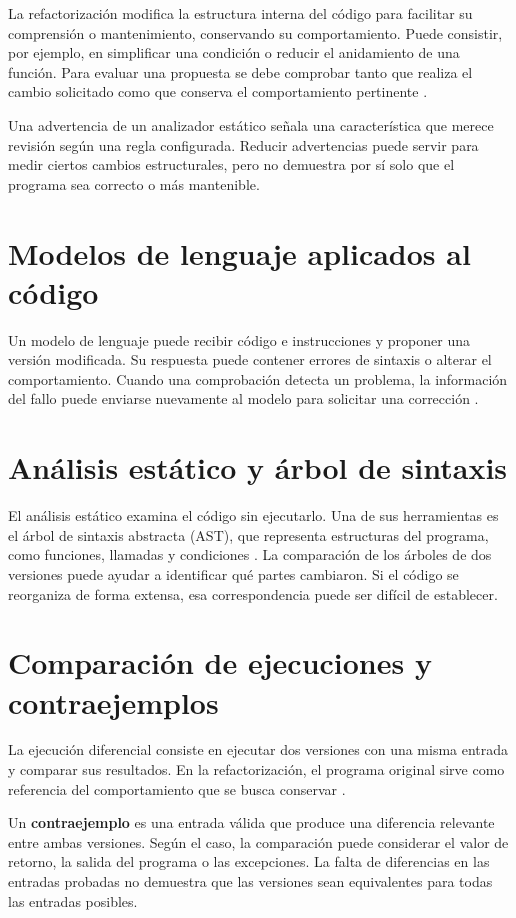 \documentclass[11pt,openright,final]{unsa}
\begin{document}
La refactorización modifica la estructura interna del código para facilitar su comprensión o mantenimiento, conservando su comportamiento. Puede consistir, por ejemplo, en simplificar una condición o reducir el anidamiento de una función. Para evaluar una propuesta se debe comprobar tanto que realiza el cambio solicitado como que conserva el comportamiento pertinente \cite{ref1}.

Una advertencia de un analizador estático señala una característica que merece revisión según una regla configurada. Reducir advertencias puede servir para medir ciertos cambios estructurales, pero no demuestra por sí solo que el programa sea correcto o más mantenible.

\section{Modelos de lenguaje aplicados al código}

Un modelo de lenguaje puede recibir código e instrucciones y proponer una versión modificada. Su respuesta puede contener errores de sintaxis o alterar el comportamiento. Cuando una comprobación detecta un problema, la información del fallo puede enviarse nuevamente al modelo para solicitar una corrección \cite{ref3}.

\section{Análisis estático y árbol de sintaxis}

El análisis estático examina el código sin ejecutarlo. Una de sus herramientas es el árbol de sintaxis abstracta (AST), que representa estructuras del programa, como funciones, llamadas y condiciones \cite{ref6}. La comparación de los árboles de dos versiones puede ayudar a identificar qué partes cambiaron. Si el código se reorganiza de forma extensa, esa correspondencia puede ser difícil de establecer.

\section{Comparación de ejecuciones y contraejemplos}

La ejecución diferencial consiste en ejecutar dos versiones con una misma entrada y comparar sus resultados. En la refactorización, el programa original sirve como referencia del comportamiento que se busca conservar \cite{ref2}.

Un \textbf{contraejemplo} es una entrada válida que produce una diferencia relevante entre ambas versiones. Según el caso, la comparación puede considerar el valor de retorno, la salida del programa o las excepciones. La falta de diferencias en las entradas probadas no demuestra que las versiones sean equivalentes para todas las entradas posibles.
\end{document}
